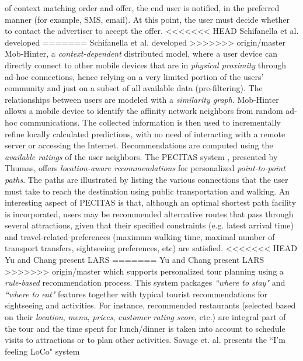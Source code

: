 of context matching order and offer, the end user is notified, in the
preferred manner (for example, SMS, email). At this point, the user
must decide whether to contact the advertiser to accept the offer.
<<<<<<< HEAD
Schifanella et al. \cite{schifanella2008mobhinter} developed
=======
Schifanella et al.\cite{schifanella2008mobhinter} developed
>>>>>>> origin/master
Mob-Hinter, a \textit{context-dependent} distributed model, where a user 
device can directly connect to other mobile devices that are in 
\textit{physical proximity} through ad-hoc connections, hence 
relying on a very limited portion of the users' community and just 
on a subset of all available data (pre-filtering). The relationships 
between users are modeled with a \textit{similarity graph}. Mob-Hinter 
allows a mobile device to identify the affinity network neighbors 
from random ad-hoc communications. The collected information 
is then used to incrementally refine locally
calculated predictions, with no need of interacting with a remote
server or accessing the Internet. Recommendations are computed
using the \textit{available ratings} of the user neighbors.
The PECITAS system \cite{tumas2009personalized}, presented by Thumas, 
offers \textit{location-aware recommendations} for personalized 
\textit{point-to-point paths}. The paths are illustrated by listing 
the various connections that the user must take to reach the 
destination using public transportation and walking. An
interesting aspect of PECITAS is that, although an optimal shortest 
path facility is incorporated, users may be recommended alternative 
routes that pass through several attractions, given that
their specified constraints (e.g. latest arrival time) and travel-related 
preferences (maximum walking time, maximal number of transport
transfers, sightseeing preferences, etc) are satisfied. 
<<<<<<< HEAD
Yu and Chang present LARS  \cite{yu2009personalized} 
=======
Yu and Chang present LARS \cite{yu2009personalized} 
>>>>>>> origin/master
which supports personalized tour planning using a \textit{rule-based} 
recommendation process. This system
packages \textit{``where to stay"} and \textit{``where to eat"} 
features together with typical tourist recommendations 
for sightseeing and activities. For
instance, recommended restaurants (selected based on their 
\textit{location}, \textit{menu},  \textit{prices}, \textit{customer rating score}, 
etc.) are integral part of the tour and the time spent for 
lunch/dinner is taken into account to schedule visits to 
attractions or to plan other activities.
Savage et. al. presents the ``I'm feeling LoCo" system \cite{savage2012m}
